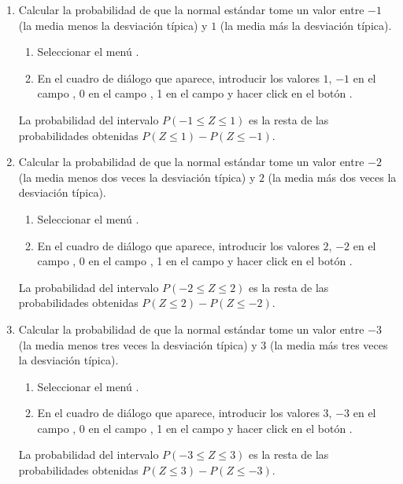 \begin{enumerate}[leftmargin=*]
\begin{enumerate}
\item Calcular la probabilidad de que la normal estándar tome un valor entre $-1$ (la media menos la desviación típica)
y $1$ (la media más la desviación típica).
\begin{indicacion}{
\begin{enumerate}
\item Seleccionar el menú .
\item En el cuadro de diálogo que aparece, introducir los valores $1$, $-1$ en el campo ,
0 en el campo , 1 en el campo  y hacer click en el botón .
\end{enumerate}
La probabilidad del intervalo $P(-1\leq Z\leq 1)$ es la resta de las probabilidades obtenidas $P(Z\leq 1)-P(Z\leq -1)$.
}
\end{indicacion}

\item Calcular la probabilidad de que la normal estándar tome un valor entre $-2$ (la media menos dos veces la desviación típica) y $2$ (la
media más dos veces la desviación típica). 
\begin{indicacion}{
\begin{enumerate}
\item Seleccionar el menú .
\item En el cuadro de diálogo que aparece, introducir los valores $2$, $-2$ en el campo ,
0 en el campo , 1 en el campo  y hacer click en el botón .
\end{enumerate}
La probabilidad del intervalo $P(-2\leq Z\leq 2)$ es la resta de las probabilidades obtenidas $P(Z\leq 2)-P(Z\leq -2)$.
}
\end{indicacion}

\item Calcular la probabilidad de que la normal estándar tome un valor entre $-3$ (la media menos tres veces la desviación típica) y $3$ (la
media más tres veces la desviación típica). 
\begin{indicacion}{
\begin{enumerate}
\item Seleccionar el menú .
\item En el cuadro de diálogo que aparece, introducir los valores $3$, $-3$ en el campo ,
0 en el campo , 1 en el campo  y hacer click en el botón .
\end{enumerate}
La probabilidad del intervalo $P(-3\leq Z\leq 3)$ es la resta de las probabilidades obtenidas $P(Z\leq 3)-P(Z\leq -3)$.
}
\end{indicacion}


\end{enumerate}
\end{enumerate}
